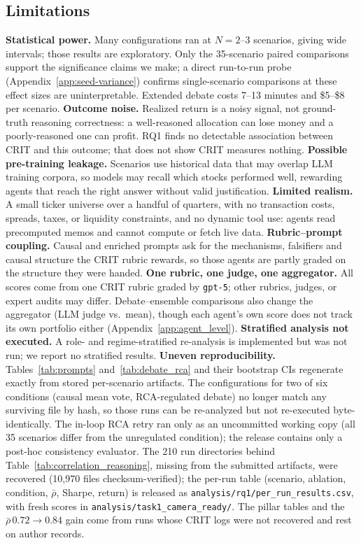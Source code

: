 \documentclass{article}
\begin{document}
\subsection{Limitations}
\vspace{-6pt}
\textbf{Statistical power.} Many configurations ran at $N{=}2$--$3$ scenarios, giving wide intervals; those results are exploratory. Only the 35-scenario paired comparisons support the significance claims we make; a direct run-to-run probe (Appendix~\ref{app:seed-variance}) confirms single-scenario comparisons at these effect sizes are uninterpretable. Extended debate costs 7--13 minutes and \$5--\$8 per scenario.
\textbf{Outcome noise.} Realized return is a noisy signal, not ground-truth reasoning
correctness: a well-reasoned allocation can lose money and a poorly-reasoned one can
profit. RQ1 finds no detectable association between CRIT and this outcome; that does
not show CRIT measures nothing.
\textbf{Possible pre-training leakage.} Scenarios use historical data that may overlap
LLM training corpora, so models may recall which stocks performed well, rewarding agents that reach the right answer without valid justification.
\textbf{Limited realism.} A small ticker universe over a handful of quarters, with no
transaction costs, spreads, taxes, or liquidity constraints, and no dynamic tool use:
agents read precomputed memos and cannot compute or fetch live data.
\textbf{Rubric--prompt coupling.} Causal and enriched prompts ask for the mechanisms,
falsifiers and causal structure the CRIT rubric rewards, so those agents are partly graded on
the structure they were handed.
\textbf{One rubric, one judge, one aggregator.} All scores come from one CRIT rubric graded
by \texttt{gpt-5}; other rubrics, judges, or expert audits may differ. Debate--ensemble comparisons
also change the aggregator (LLM judge vs.\ mean), though each agent's own score does not track its
own portfolio either (Appendix~\ref{app:agent_level}).
\textbf{Stratified analysis not executed.} A role- and regime-stratified re-analysis is
implemented but was not run; we report no stratified results.
\textbf{Uneven reproducibility.} Tables~\ref{tab:prompts} and~\ref{tab:debate_rca} and their
bootstrap CIs regenerate exactly from stored per-scenario artifacts. The configurations for two of
six conditions (causal mean vote, RCA-regulated debate) no longer match any surviving file by
hash, so those runs can be re-analyzed but not re-executed byte-identically. The in-loop RCA retry
ran only as an uncommitted working copy (all 35 scenarios differ from the unregulated condition);
the release contains only a post-hoc consistency evaluator. The 210 run directories behind
Table~\ref{tab:correlation_reasoning}, missing from the submitted artifacts, were recovered
(10{,}970 files checksum-verified); the per-run table (scenario, ablation, condition, $\bar{\rho}$,
Sharpe, return) is released as \texttt{analysis/rq1/per\_run\_results.csv}, with fresh scores in
\texttt{analysis/task1\_camera\_ready/}. The pillar tables and the $\bar{\rho}\,0.72\!\to\!0.84$
gain come from runs whose CRIT logs were not recovered and rest on author records.
\end{document}
